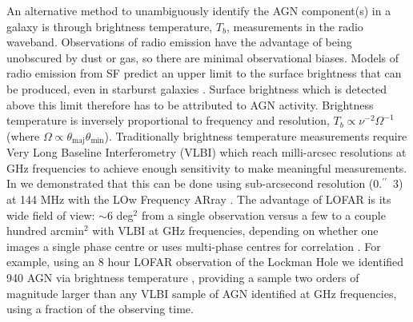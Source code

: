 \documentclass[usenatbib,fleqn,letters]{mnras}
\newcommand{\sarc}{$^{\prime\prime}\!\!$}
\begin{document}
An alternative method to unambiguously identify the AGN component(s) in a galaxy is through brightness temperature, $T_b$, measurements in the radio waveband. Observations of radio emission have the advantage of being unobscured by dust or gas, so there are minimal observational biases. %
Models of radio emission from SF predict an upper limit to the surface brightness that can be produced, even in starburst galaxies \citep{condon_radio_1992}. Surface brightness which is detected above this limit therefore has to be attributed to AGN activity. Brightness temperature is inversely proportional to frequency and resolution, $T_b \propto \nu^{-2}\Omega^{-1}$ (where $\Omega \propto \theta_{\text{maj}}\theta_{\text{min}}$). Traditionally brightness temperature measurements require Very Long Baseline Interferometry (VLBI) which reach milli-arcsec resolutions at GHz frequencies \citep[e.g.,][]{middelberg_mosaiced_2013,herrera_ruiz_faint_2017,radcliffe_nowhere_2018} to achieve enough sensitivity to make meaningful measurements. In \cite[][hereafter, ]{morabito_identifying_2022} we demonstrated that this can be done using sub-arcsecond resolution (0.\sarc\ 3) at 144 MHz with the LOw Frequency ARray \citep[LOFAR;][]{van_haarlem_lofar:_2013}. The advantage of LOFAR is its wide field of view: $\sim$6 deg$^2$ from a single observation versus a few to a couple hundred arcmin$^2$ with VLBI at GHz frequencies, depending on whether one images a single phase centre or uses multi-phase centres for correlation \citep{deller_difx-2:_2011,morgan_vlbi_2011}. For example, using an 8 hour LOFAR observation of the Lockman Hole \citep{sweijen_deep_2022} we identified 940 AGN via brightness temperature , providing a sample two orders of magnitude larger than any VLBI sample of AGN identified at GHz frequencies, using a fraction of the observing time.
\end{document}

